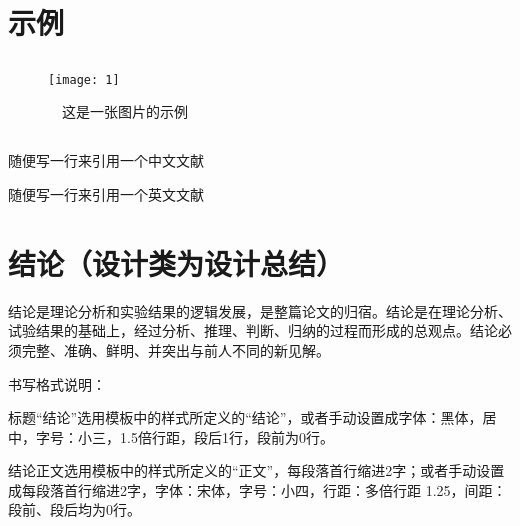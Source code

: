 \documentclass[UTF8,a4paper]{ctexart}
\numberwithin{table}{section}
\numberwithin{equation}{section}
\begin{document}
	\section{\fontsize{15}{22.5} {\heiti 示例}} 
	\subsection{}
	\begin{figure}[h]
		\centering
		\caption{\ \ 这是一张图片的示例}
		\texttt{[image: 1]}
	\end{figure}
	\subsection{}
	随便写一行来引用一个中文文献\cite{姬丽娜2017基于GPU的视频流人群实时计数}\par 
	随便写一行来引用一个英文文献\cite{Hubel1962Receptive}
	\newpage
	\section*{\fontsize{15}{22.5} {\heiti 结\quad\quad 论（设计类为设计总结）}}
	结论是理论分析和实验结果的逻辑发展，是整篇论文的归宿。结论是在理论分析、试验结果的基础上，经过分析、推理、判断、归纳的过程而形成的总观点。结论必须完整、准确、鲜明、并突出与前人不同的新见解。\par 
	书写格式说明：\par 
	标题“结论”选用模板中的样式所定义的“结论”，或者手动设置成字体：黑体，居中，字号：小三，1.5倍行距，段后1行，段前为0行。\par
	结论正文选用模板中的样式所定义的“正文”，每段落首行缩进2字；或者手动设置成每段落首行缩进2字，字体：宋体，字号：小四，行距：多倍行距 1.25，间距：段前、段后均为0行。\par 
	\newpage
	\renewcommand{\refname}{\fontsize{15}{22.5} \bf{\heiti 参\ 考\ 文\ 献}}
	
	
	\newpage
\end{document}

